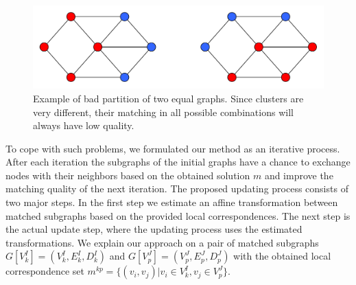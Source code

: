 \begin{figure}[h]
	\centering
	\includegraphics[scale=0.35]{chapter2/fig/badpartition.pdf}
	\caption[Example of bad partition of two equal graphs]{Example of bad partition of two equal graphs. Since clusters are very different, their matching in all possible combinations will always have low quality.} \label{fig:badpartition}
\end{figure}

To cope with such problems, we formulated our method as an iterative process. After each iteration the subgraphs of the initial graphs have a chance to exchange nodes with their neighbors based on the obtained solution $m$ and improve the matching quality of the next iteration. The proposed updating process consists of two major steps. In the first step we estimate an affine transformation between matched subgraphs based on the provided local correspondences. The next step is the actual update step, where the updating process uses the estimated transformations.
We explain our approach on a pair of matched subgraphs $G[V^I_k]=(V^I_k, E^I_k, D^I_k)$ and $G[V^J_p]=(V^J_p, E^J_p, D^J_p)$  with the obtained local correspondence set $m^{kp}=\{(v_i,v_j)|v_i\in V^I_k, v_j\in V^J_p\}$. 

